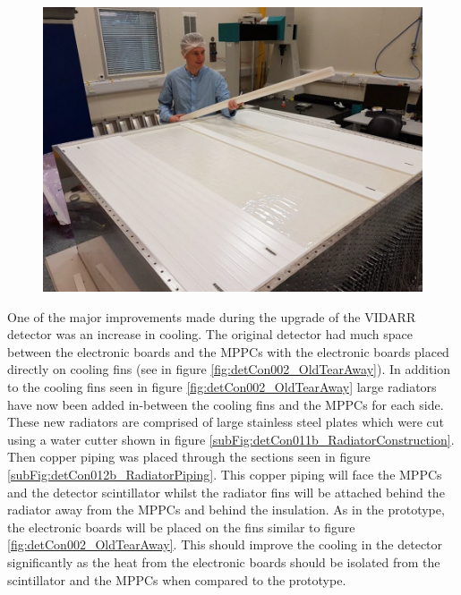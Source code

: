 \begin{figure}[htbp]
\centering
\includegraphics[width=0.8\linewidth]{Chapter3/Figs/Raster/detCon006_RonInCleanRoom.png}
\label{fig:detCon006_RonInCleanRoom}
\end{figure}

One of the major improvements made during the upgrade of the VIDARR detector was an increase in cooling. The original detector had much space between the electronic boards and the MPPCs with the electronic boards placed directly on cooling fins (see in figure \ref{fig:detCon002_OldTearAway}). In addition to the cooling fins seen in figure \ref{fig:detCon002_OldTearAway} large radiators have now been added in-between the cooling fins and the MPPCs for each side. These new radiators are comprised of large stainless steel plates which were cut using a water cutter shown in figure \ref{subFig:detCon011b_RadiatorConstruction}. Then copper piping was placed through the sections seen in figure \ref{subFig:detCon012b_RadiatorPiping}. This copper piping will face the MPPCs and the detector scintillator whilst the radiator fins will be attached behind the radiator away from the MPPCs and behind the insulation. As in the prototype, the electronic boards will be placed on the fins similar to figure \ref{fig:detCon002_OldTearAway}. This should improve the cooling in the detector significantly as the heat from the electronic boards should be isolated from the scintillator and the MPPCs when compared to the prototype. 

